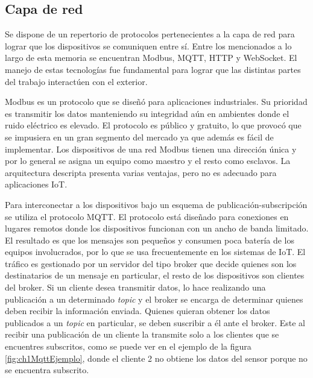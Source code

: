 
\subsection{Capa de red}
Se dispone de un repertorio de protocolos pertenecientes a la capa de red para lograr que los dispositivos se comuniquen entre sí.
Entre los mencionados a lo largo de esta memoria se encuentran Modbus, MQTT, HTTP y WebSocket. El manejo de estas tecnologías fue fundamental para lograr que las distintas partes del trabajo interactúen con el exterior.

Modbus es un protocolo que se diseñó para aplicaciones industriales.
Su prioridad es transmitir los datos manteniendo su integridad aún en ambientes donde el ruido eléctrico es elevado. El protocolo es público y gratuito, lo que provocó que se impusiera en un gran segmento del mercado ya que además es fácil de implementar.
Los dispositivos de una red Modbus tienen una dirección única y por lo general se asigna un equipo como maestro y el resto como esclavos. La arquitectura descripta presenta varias ventajas, pero no es adecuado para aplicaciones IoT.

Para interconectar a los dispositivos bajo un esquema de publicación-subscripción se utiliza el protocolo MQTT.
El protocolo está diseñado para conexiones en lugares remotos donde los dispositivos funcionan con un ancho de banda limitado.
El resultado es que los mensajes son pequeños y consumen poca batería de los equipos involucrados, por lo que se usa frecuentemente en los sistemas de IoT.
El tráfico es gestionado por un servidor del tipo broker que decide quienes son los destinatarios de un mensaje en particular, el resto de los dispositivos son clientes del broker.
Si un cliente desea transmitir datos, lo hace realizando una publicación a un determinado \emph{topic} y el broker se encarga de determinar quienes deben recibir la información enviada.
Quienes quieran obtener los datos publicados a un \emph{topic} en particular, se deben suscribir a él ante el broker.
Este al recibir una publicación de un cliente la transmite solo a los clientes que se encuentres subscritos, como se puede ver en el ejemplo de la figura \ref{fig:ch1MqttEjemplo}, donde el cliente 2 no obtiene los datos del sensor porque no se encuentra subscrito.

